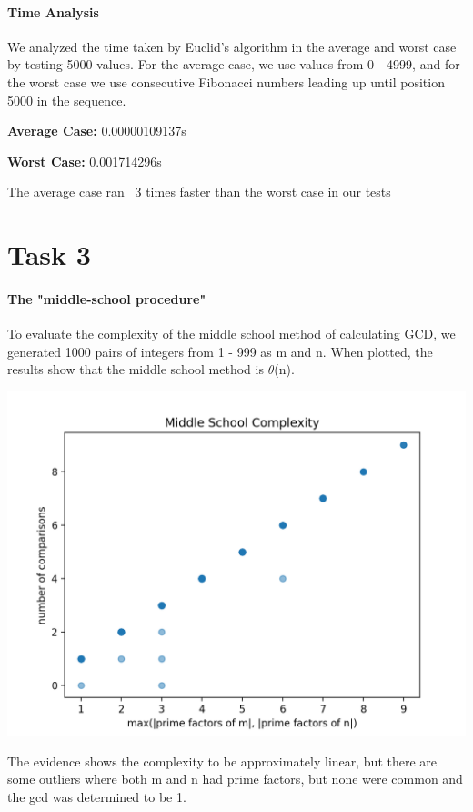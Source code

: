 \documentclass{report}
\begin{document}
\begin{flushleft}
		\paragraph{Time Analysis}

		We analyzed the time taken by Euclid's algorithm in the average and worst case by testing 5000 values. For the average case,
		we use values from 0 - 4999, and for the worst case we use consecutive Fibonacci numbers leading up until 
		position 5000 in the sequence.
		
		\textbf{Average Case:} 0.00000109137s

		\textbf{Worst Case: } 0.001714296s

		The average case ran ~3 times faster than the worst case in our tests

		\section{Task 3}

		\paragraph{The "middle-school procedure"}
		To evaluate the complexity of the middle school method of calculating GCD, we generated 1000 pairs of integers from 1 - 999 as m and n. When plotted, the results
		show that the middle school method is $\theta$(n).

		\includegraphics{task3}

		The evidence shows the complexity to be approximately linear, but there are some outliers where 
		both m and n had prime factors, but none were common and the gcd was determined to be 1.


	\end{flushleft}
\end{document}
